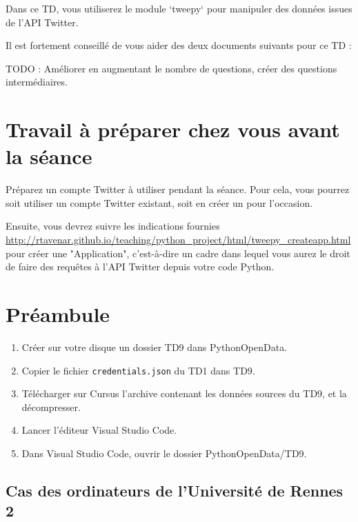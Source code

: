 \documentclass[11pt,a4paper]{article}
\begin{document}
Dans ce TD, vous utiliserez le module `tweepy` pour manipuler des données issues de l'API Twitter.

Il est fortement conseillé de vous aider des deux documents suivants pour ce TD :




TODO : Améliorer en augmentant le nombre de questions, créer des questions intermédiaires. 

\section*{Travail à préparer chez vous avant la séance}

Préparez un compte Twitter à utiliser pendant la séance. Pour cela, vous pourrez soit utiliser un compte Twitter existant, soit en créer un pour l'occasion. 

Ensuite, vous devrez suivre les indications fournies \url{http://rtavenar.github.io/teaching/python_project/html/tweepy_createapp.html} pour créer une "Application", c'est-à-dire un cadre dans lequel vous aurez le droit de faire des requêtes à l'API Twitter depuis votre code Python.


\section*{Préambule}
\begin{enumerate}
    \item Créer sur votre disque un dossier TD9 dans PythonOpenData. 
    \item Copier le fichier \verb+credentials.json+ du TD1 dans TD9.
    \item Télécharger sur Cursus l'archive contenant les données sources du TD9, et la décompresser.
    \item Lancer l'éditeur Visual Studio Code.
    \item Dans Visual Studio Code, ouvrir le dossier PythonOpenData/TD9. 
\end{enumerate}

\subsection*{Cas des ordinateurs de l'Université de Rennes 2}
\end{document}
